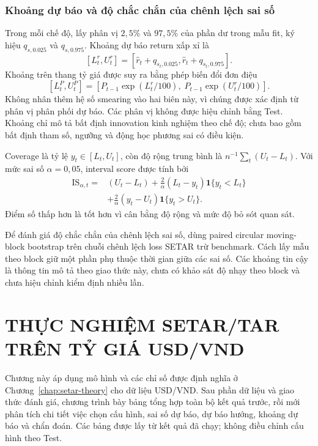 \documentclass[a4paper,reqno,oneside]{book}
\numberwithin{equation}{chapter}
\begin{document}
\subsection{Khoảng dự báo và độ chắc chắn của chênh lệch sai số}

Trong mỗi chế độ, lấy phân vị $2{,}5\%$ và $97{,}5\%$ của phần dư trong mẫu fit, ký hiệu $q_{s,0.025}$ và $q_{s,0.975}$. Khoảng dự báo return xấp xỉ là
\[
 [L_t^r,U_t^r]=
 [\widehat r_t+q_{s_t,0.025},\widehat r_t+q_{s_t,0.975}].
\]
Khoảng trên thang tỷ giá được suy ra bằng phép biến đổi đơn điệu
\[
 [L_t^P,U_t^P]=
 [P_{t-1}\exp(L_t^r/100),\;P_{t-1}\exp(U_t^r/100)].
\]
Không nhân thêm hệ số smearing vào hai biên này, vì chúng được xác định từ phân vị phân phối dự báo. Các phân vị không được hiệu chỉnh bằng Test. Khoảng chỉ mô tả bất định innovation kinh nghiệm theo chế độ; chưa bao gồm bất định tham số, ngưỡng và động học phương sai có điều kiện.

Coverage là tỷ lệ $y_t\in[L_t,U_t]$, còn độ rộng trung bình là $n^{-1}\sum_t(U_t-L_t)$. Với mức sai số $\alpha=0{,}05$, interval score được tính bởi
\begin{align}
 \mathrm{IS}_{\alpha,t}
  ={}&(U_t-L_t)
  +\frac{2}{\alpha}(L_t-y_t)\mathbf1\{y_t<L_t\}\nonumber\\
  &+\frac{2}{\alpha}(y_t-U_t)\mathbf1\{y_t>U_t\}.
\end{align}
Điểm số thấp hơn là tốt hơn vì cân bằng độ rộng và mức độ bỏ sót quan sát.

Để đánh giá độ chắc chắn của chênh lệch sai số, dùng paired circular moving-block bootstrap trên chuỗi chênh lệch loss SETAR trừ benchmark. Cách lấy mẫu theo block giữ một phần phụ thuộc thời gian giữa các sai số. Các khoảng tin cậy là thông tin mô tả theo giao thức này, chưa có khảo sát độ nhạy theo block và chưa hiệu chỉnh kiểm định nhiều lần.

\chapter{THỰC NGHIỆM SETAR/TAR TRÊN TỶ GIÁ USD/VND}
\label{chap:setar-experiment}

Chương này áp dụng mô hình và các chỉ số được định nghĩa ở Chương~\ref{chap:setar-theory} cho dữ liệu USD/VND. Sau phần dữ liệu và giao thức đánh giá, chương trình bày bảng tổng hợp toàn bộ kết quả trước, rồi mới phân tích chi tiết việc chọn cấu hình, sai số dự báo, dự báo hướng, khoảng dự báo và chẩn đoán. Các bảng được lấy từ kết quả đã chạy; không điều chỉnh cấu hình theo Test.
\end{document}
